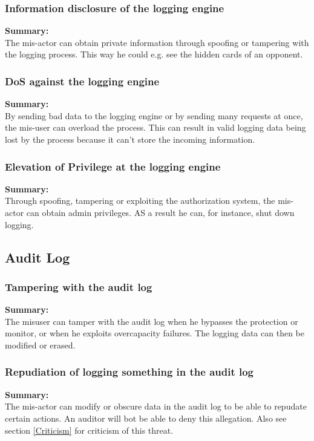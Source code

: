 \documentclass[a4paper,11pt]{report}
\begin{document}
\subsubsection{Information disclosure of the logging engine}
\label{LoggingEngineCasesI}
\textbf{Summary:} \\
The mis-actor can obtain private information through spoofing or tampering with the logging process. This way he could e.g. see the hidden cards of an opponent.

\subsubsection{DoS against the logging engine}
\label{LoggingEngineCasesD}
\textbf{Summary:} \\
By sending bad data to the logging engine or by sending many requests at once, the mis-user can overload the process. This can result in valid logging data being lost by the process because it can't store the incoming information.

\subsubsection{Elevation of Privilege at the logging engine}
\label{LoggingEngineCasesE}
\textbf{Summary:} \\
Through spoofing, tampering or exploiting the authorization system, the mis-actor can obtain admin privileges. AS a result he can, for instance, shut down logging.

\subsection{Audit Log}
\label{AuditLogCases}

\subsubsection{Tampering with the audit log}
\label{AuditLogCasesT}
\textbf{Summary:} \\
The misuser can tamper with the audit log when he bypasses the protection or monitor, or when he exploits overcapacity failures. The logging data can then be modified or erased.

\subsubsection{Repudiation of logging something in the audit log}
\label{AuditLogCasesR}
\textbf{Summary:} \\
The mis-actor can modify or obscure data in the audit log to be able to
repudate certain actions. An auditor will bot be able to deny this
allegation.
Also see section \ref{Criticism} for criticism of this threat.
\end{document}
